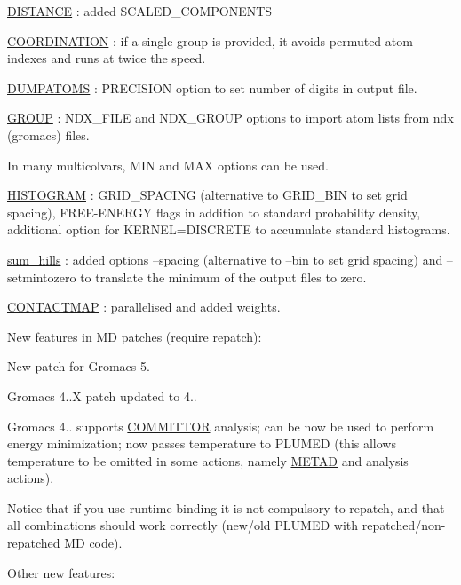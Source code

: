 \begin{DoxyItemize}
\begin{DoxyItemize}
\item \hyperlink{DISTANCE}{D\+I\+S\+T\+A\+N\+C\+E} \+: added S\+C\+A\+L\+E\+D\+\_\+\+C\+O\+M\+P\+O\+N\+E\+N\+T\+S
\item \hyperlink{COORDINATION}{C\+O\+O\+R\+D\+I\+N\+A\+T\+I\+O\+N} \+: if a single group is provided, it avoids permuted atom indexes and runs at twice the speed.
\item \hyperlink{DUMPATOMS}{D\+U\+M\+P\+A\+T\+O\+M\+S} \+: P\+R\+E\+C\+I\+S\+I\+O\+N option to set number of digits in output file.
\item \hyperlink{GROUP}{G\+R\+O\+U\+P} \+: N\+D\+X\+\_\+\+F\+I\+L\+E and N\+D\+X\+\_\+\+G\+R\+O\+U\+P options to import atom lists from ndx (gromacs) files.
\item In many multicolvars, M\+I\+N and M\+A\+X options can be used.
\item \hyperlink{HISTOGRAM}{H\+I\+S\+T\+O\+G\+R\+A\+M} \+: G\+R\+I\+D\+\_\+\+S\+P\+A\+C\+I\+N\+G (alternative to G\+R\+I\+D\+\_\+\+B\+I\+N to set grid spacing), F\+R\+E\+E-\/\+E\+N\+E\+R\+G\+Y flags in addition to standard probability density, additional option for K\+E\+R\+N\+E\+L=D\+I\+S\+C\+R\+E\+T\+E to accumulate standard histograms.
\item \hyperlink{sum_hills}{sum\+\_\+hills} \+: added options --spacing (alternative to --bin to set grid spacing) and --setmintozero to translate the minimum of the output files to zero.
\item \hyperlink{CONTACTMAP}{C\+O\+N\+T\+A\+C\+T\+M\+A\+P} \+: parallelised and added weights.
\end{DoxyItemize}
\item New features in M\+D patches (require repatch)\+:
\begin{DoxyItemize}
\item New patch for Gromacs 5.
\item Gromacs 4..\+X patch updated to 4..
\item Gromacs 4.. supports \hyperlink{COMMITTOR}{C\+O\+M\+M\+I\+T\+T\+O\+R} analysis; can be now be used to perform energy minimization; now passes temperature to P\+L\+U\+M\+E\+D (this allows temperature to be omitted in some actions, namely \hyperlink{METAD}{M\+E\+T\+A\+D} and analysis actions).
\end{DoxyItemize}Notice that if you use runtime binding it is not compulsory to repatch, and that all combinations should work correctly (new/old P\+L\+U\+M\+E\+D with repatched/non-\/repatched M\+D code).
\item Other new features\+:

\end{DoxyItemize}
